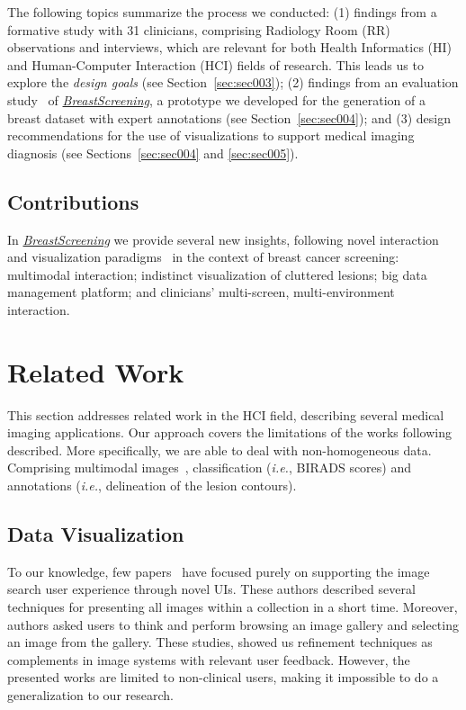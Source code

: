 The following topics summarize the process we conducted:
(1) findings from a formative study with 31 clinicians, comprising Radiology Room (RR) observations and interviews, which are relevant for both Health Informatics (HI) and Human-Computer Interaction (HCI) fields of research.
This leads us to explore the {\it design goals} (see Section~\ref{sec:sec003});
(2) findings from an evaluation study~\cite{https://doi.org/10.13140/rg.2.2.16566.14403/1} of \href{https://breastscreening.github.io/}{{\it BreastScreening}}, a prototype we developed for the generation of a breast dataset with expert annotations (see Section~\ref{sec:sec004}); and
(3) design recommendations for the use of visualizations to support medical imaging diagnosis (see Sections~\ref{sec:sec004} and \ref{sec:sec005}).

\subsection{Contributions}

In \href{https://breastscreening.github.io/}{{\it BreastScreening}} we provide several new insights, following novel interaction and visualization paradigms~\cite{PAULO2019103316} in the context of breast cancer screening:
 multimodal interaction;
 indistinct visualization of cluttered lesions;
 big data management platform; and
 clinicians' multi-screen, multi-environment interaction. \section{Related Work}
\label{sec:sec002}

This section addresses related work in the HCI field, describing several medical imaging applications.
Our approach covers the limitations of the works following described.
More specifically, we are able to deal with non-homogeneous data.
Comprising multimodal images~\cite{Zhang_2018_CVPR}, classification ({\it i.e.}, BIRADS scores) and annotations ({\it i.e.}, delineation of the lesion contours).

\subsection{Data Visualization}

To our knowledge, few papers~\cite{10.1145/1133265.1133354, 10.1145/2909132.2909248, 10.1145/3206505.3206602} have focused purely on supporting the image search user experience through novel UIs.
These authors described several techniques for presenting all images within a collection in a short time.
Moreover, authors asked users to think and perform browsing an image gallery and selecting an image from the gallery.
These studies, showed us refinement techniques as complements in image systems with relevant user feedback.
However, the presented works are limited to non-clinical users, making it impossible to do a generalization to our research.

